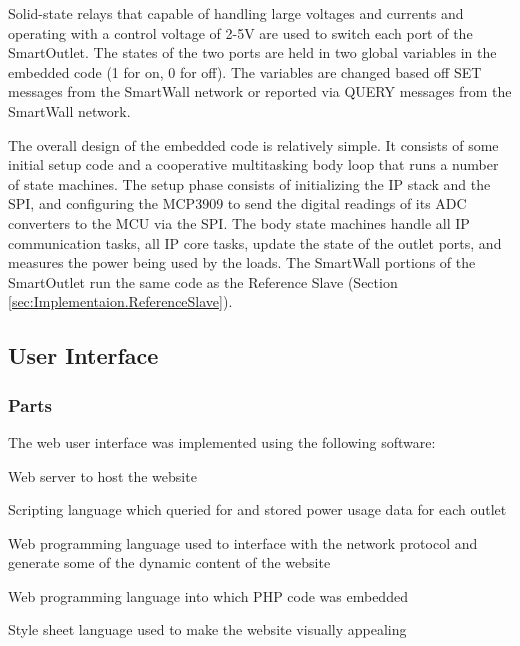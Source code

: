 \documentclass[11pt]{article}
\begin{document}
Solid-state relays that capable of handling large
voltages and currents and operating with a control
voltage of 2-5V are used to switch each port of the SmartOutlet.
The states of the two ports are held in two
global variables in the embedded code (1 for on, 0 for off).  The
variables are changed based off SET messages from the SmartWall
network or reported via QUERY messages from the SmartWall network.

The overall design of the embedded code is relatively simple.
It consists of some initial setup code and a cooperative multitasking
body  loop that runs a number of state machines.
The setup phase consists of
initializing the IP stack and the SPI, and configuring the MCP3909 to
send the digital readings of its ADC converters to the MCU via the
SPI. The body state machines handle all IP communication tasks, all IP
core tasks, update the state of the outlet ports, and measures the
power being used by the loads. The SmartWall portions of the
SmartOutlet run the same code as the Reference Slave (Section
\ref{sec:Implementaion.ReferenceSlave}).

\subsection{User Interface}
\subsubsection{Parts}
The web user interface was implemented using the following software:
\begin{description}
  \setlength{\itemsep}{0pt}
  \setlength{\parskip}{0pt}
  \setlength{\parsep}{0pt}
\item[Apache2:] Web server to host the website
\item[Perl:] Scripting language which queried for and stored power usage
  data for each outlet
\item[PHP5:] Web programming language used to interface with the network
  protocol and generate some of the dynamic content of the website
\item[HTML:] Web programming language into which PHP code was embedded
\item[CSS:] Style sheet language used to make the website visually appealing
\end{description}
\end{document}
